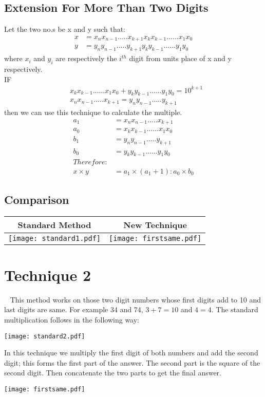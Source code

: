 \documentclass[]{article}
\begin{document}
\subsection{Extension For More Than Two Digits}
Let the two no.s be x and y such that:
\begin{align*}
x &= x_nx_{n-1}.....x_{k+1}x_kx_{k-1}......x_1x_0\\
y &=  y_ny_{n-1}.....y_{k+1}y_ky_{k-1}......y_1y_0
\end{align*}
where $x_i$ and $y_i$ are respectively the $i^{th}$ digit from units place of x and y respectively.\\
IF\\
\begin{align*}
&x_kx_{k-1}......x_1x_0 + y_ky_{k-1}......y_1y_0 = 10^{k+1}\\
&x_nx_{n-1}.....x_{k+1} = y_ny_{n-1}.....y_{k+1}
\end{align*}
then we can use this technique to calculate the multiple.\\
\begin{align*}
a_1 &=  x_nx_{n-1}.....x_{k+1}\\
a_0 &=  x_kx_{k-1}......x_1x_0\\
b_1 &= y_ny_{n-1}.....y_{k+1}\\
b_0 &= y_ky_{k-1}......y_1y_0\\
Therefore:\\
x \times y &= a_1 \times (a_1 + 1) : a_0 \times b_0
\end{align*}

\subsection{Comparison}
\begin{table}[!h]
\begin{center}
\begin{tabular}{|c|c|}
\hline
Standard Method& New Technique\\
\hline
\texttt{[image: standard1.pdf]}&\texttt{[image: firstsame.pdf]}\\
\hline
\end{tabular}
\end{center}
\end{table}

\section{Technique 2}~\cite{Atharvaveda}
This method works on those two digit numbers whose first digits add to 10 and last digits are same. For example 34 and 74, $3 + 7 = 10$ and $4 = 4$. The standard multiplication follows in the following way:\\
\begin{center}\texttt{[image: standard2.pdf]}\end{center}
In this technique we multiply the first digit of both numbers and add the second digit; this forms the first part of the answer. The second part is the square of the second digit. Then concatenate the two parts to get the final answer.
\begin{center}\texttt{[image: firstsame.pdf]}\end{center}
\end{document}
